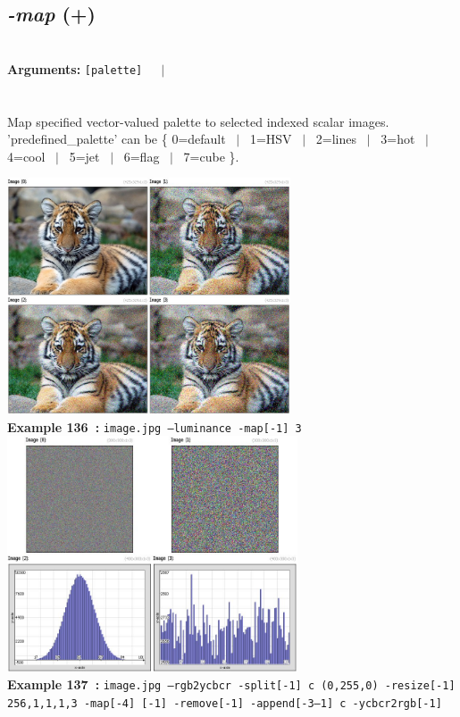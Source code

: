\documentclass[a4paper,11pt,twoside]{book}
\begin{document}
\subsection{\emph{-map} (+)}\vspace*{-0.5em}
~\\\textbf{Arguments: } 
{\small \texttt{[palette]}}~~~$|$\\
\\~\\
Map specified vector-valued palette to selected indexed scalar images.
~\\'predefined\_palette' can be \{ 0=default ~$|$~ 1=HSV ~$|$~ 2=lines ~$|$~ 3=hot ~$|$~ 4=cool ~$|$~ 5=jet ~$|$~ 6=flag ~$|$~ 7=cube \}.
\begin{center}\includegraphics[keepaspectratio=true,height=7cm,width=\textwidth]{img/gmic_def136.jpg}\\
{\footnotesize \textbf{Example 136~:} \texttt{image.jpg --luminance -map[-1] 3}}
\\\includegraphics[keepaspectratio=true,height=7cm,width=\textwidth]{img/gmic_def137.jpg}\\
{\footnotesize \textbf{Example 137~:} \texttt{image.jpg --rgb2ycbcr -split[-1] c (0,255,0) -resize[-1] 256,1,1,1,3 -map[-4] [-1] -remove[-1] -append[-3--1] c -ycbcr2rgb[-1]}}
\end{center}
\end{document}
